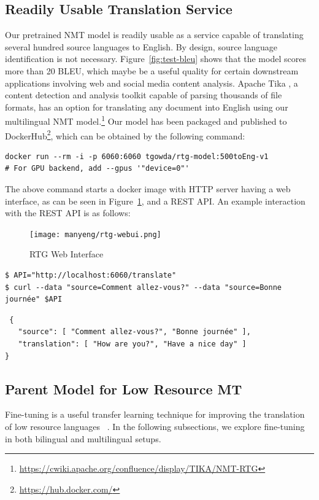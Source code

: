 \subsection{Readily Usable Translation Service}
\label{sec:value.off-shelf-mt}
Our pretrained NMT model is readily usable as a service capable of translating several hundred source languages to English.
By design, source language identification is not necessary.
Figure~\ref{fig:test-bleu} shows that the model scores more than 20 BLEU, which maybe be a useful quality for certain downstream applications involving web and social media content analysis.
Apache Tika \cite{mattmann2011tika}, a content detection and analysis toolkit capable of parsing thousands of file formats, has an option for translating any document into English using our multilingual NMT model.\footnote{\url{https://cwiki.apache.org/confluence/display/TIKA/NMT-RTG}} Our model has been packaged and published to DockerHub\footnote{\url{https://hub.docker.com/}}, which can be obtained by the following command:
\begin{verbatim}
docker run --rm -i -p 6060:6060 tgowda/rtg-model:500toEng-v1
# For GPU backend, add --gpus '"device=0"' 
\end{verbatim}

The above command starts a docker image with HTTP server having a web interface, as can be seen in Figure~\ref{fig:rtg-webui}, and a REST API.
An example interaction with the REST API is as follows: 
\begin{figure}[ht]
    \centering
    \texttt{[image: manyeng/rtg-webui.png]}
    \caption{RTG Web Interface}
    \label{fig:rtg-webui}
\end{figure}

\begin{verbatim}
$ API="http://localhost:6060/translate"
$ curl --data "source=Comment allez-vous?" --data "source=Bonne journée" $API
\end{verbatim}

\begin{verbatim}
 { 
   "source": [ "Comment allez-vous?", "Bonne journée" ],
   "translation": [ "How are you?", "Have a nice day" ]
}
\end{verbatim}


\subsection{Parent Model for Low Resource MT}
\label{sec:value.transfer-learning}
 Fine-tuning is a useful transfer learning technique for improving the translation of low resource languages ~\cite{zoph-etal-2016-transfer,neubig-hu-2018-rapid,gheini2019universal}. 
 In the following subsections, we explore fine-tuning in both bilingual and multilingual setups.
 
